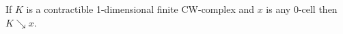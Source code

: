 If $K$ is a contractible 1-dimensional finite CW-complex and $x$ is any 0-cell then $K \searrow x$.
